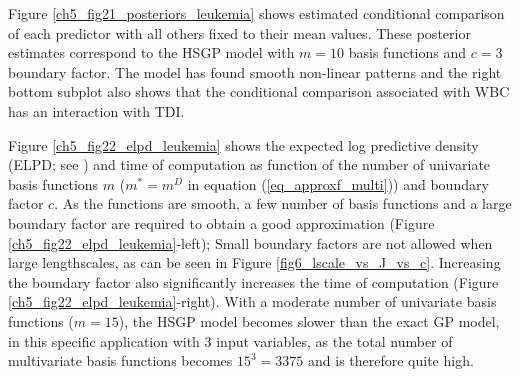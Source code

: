 \documentclass[onecolumn,a4paper,11pt]{article}
\begin{document}
Figure \ref{ch5_fig21_posteriors_leukemia} shows estimated conditional comparison of each predictor with all others fixed to their mean values. These posterior estimates correspond to the HSGP model with $m=10$ basis functions and $c=3$ boundary factor. The model has found smooth non-linear patterns and the right bottom subplot also shows that the conditional comparison associated with WBC has an interaction with TDI.


Figure \ref{ch5_fig22_elpd_leukemia} shows the expected log predictive density (ELPD; see \cite{vehtari_2012}) and time of computation as function of the number of univariate basis functions $m$ ($m^{\ast}=m^D$ in equation (\ref{eq_approxf_multi})) and boundary factor $c$. As the functions are smooth, a few number of basis functions and a large boundary factor are required to obtain a good approximation (Figure \ref{ch5_fig22_elpd_leukemia}-left); Small boundary factors are not allowed when large lengthscales, as can be seen in Figure \ref{fig6_lscale_vs_J_vs_c}. Increasing the boundary factor also significantly increases the time of computation (Figure \ref{ch5_fig22_elpd_leukemia}-right). With a moderate number of univariate basis functions ($m=15$), the HSGP model becomes slower than the exact GP model, in this specific application with $3$ input variables, as the total number of multivariate basis functions becomes $15^3 = 3375$ and is therefore quite high. 
%
\end{document}
